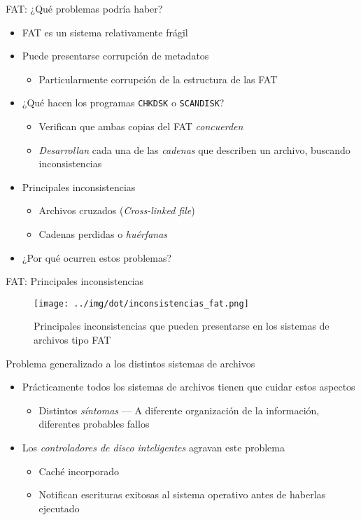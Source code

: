 \documentclass[presentation]{beamer}
\begin{document}
\begin{frame}[label={sec:org35c177f},fragile]{FAT: ¿Qué problemas podría haber?}
 \begin{itemize}
\item FAT es un sistema relativamente frágil
\item Puede presentarse corrupción de metadatos
\begin{itemize}
\item Particularmente corrupción de la estructura de las FAT
\end{itemize}
\item ¿Qué hacen los programas \texttt{CHKDSK} o \texttt{SCANDISK}?
\begin{itemize}
\item Verifican que ambas copias del FAT \emph{concuerden}
\item \emph{Desarrollan} cada una de las \emph{cadenas} que describen un archivo,
buscando inconsistencias
\end{itemize}
\item Principales inconsistencias
\begin{itemize}
\item Archivos cruzados (\emph{Cross-linked file})
\item Cadenas perdidas o \emph{huérfanas}
\end{itemize}
\item ¿Por qué ocurren estos problemas?
\end{itemize}
\end{frame}

\begin{frame}[label={sec:org8b3e2d5}]{FAT: Principales inconsistencias}
\begin{figure}[htbp]
\centering
\texttt{[image: ../img/dot/inconsistencias\_fat.png]}
\caption{Principales inconsistencias que pueden presentarse en los sistemas de archivos tipo FAT}
\end{figure}
\end{frame}

\begin{frame}[label={sec:org40e8ad7}]{Problema generalizado a los distintos sistemas de archivos}
\begin{itemize}
\item Prácticamente todos los sistemas de archivos tienen que cuidar estos
aspectos
\begin{itemize}
\item Distintos \emph{síntomas} — A diferente organización de la información,
diferentes probables fallos
\end{itemize}
\item Los \emph{controladores de disco inteligentes} agravan este problema
\begin{itemize}
\item Caché incorporado
\item Notifican escrituras exitosas al sistema operativo antes de
haberlas ejecutado
\end{itemize}
\end{itemize}
\end{frame}
\end{document}
